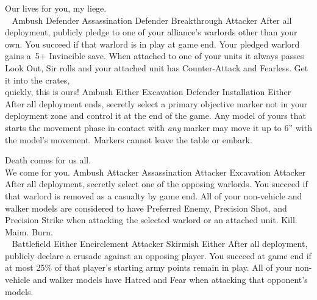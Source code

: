 \clearpage
\squelchbackground

\noindent%
%
{Our lives for you, my liege.\\~}%
{Ambush}%
{Defender}%
{Assassination}%
{Defender}%
{Breakthrough}%
{Attacker}%
{After all deployment, publicly pledge to one of your alliance's
  warlords other than your own.  You succeed if that warlord is in
  play at game end.}%
{Your pledged warlord gains a~5+ Invincible save.  When attached to
  one of your units it always passes Look Out, Sir rolls and your
  attached unit has Counter-Attack and Fearless.}
\hfill
%
{Get it into the crates,\\quickly, this is ours!}%
{Ambush}%
{Either}%
{Excavation}%
{Defender}%
{Installation}%
{Either}%
{After all deployment ends, secretly select a primary objective marker
  not in your deployment zone and control it at the end of the game.}%
{Any model of yours that starts the movement phase in contact with
  \emph{any} marker may move it up to 6'' with the model's movement.
  Markers cannot leave the table or embark.}


\vfill

\noindent%
%
{Death comes for us all.\\We come for you.}%
{Ambush}%
{Attacker}%
{Assassination}%
{Attacker}%
{Excavation}%
{Attacker}%
{After all deployment, secretly select one of the opposing warlords.
  You succeed if that warlord is removed as a casualty by game end.}%
{All of your non-vehicle and walker models are considered to have
  Preferred Enemy, Precision Shot, and Precision Strike when attacking
  the selected warlord or an attached unit.}
\hfill
%
{Kill.  Maim.  Burn.\\~}%
{Battlefield}%
{Either}%
{Encirclement}%
{Attacker}%
{Skirmish}%
{Either}%
{After all deployment, publicly declare a crusade against an opposing
  player.  You succeed at game end if at most 25\% of that player's
  starting army points remain in play.}%
{All of your non-vehicle and walker models have Hatred and Fear when
  attacking that opponent's models.}


\pagebreak

